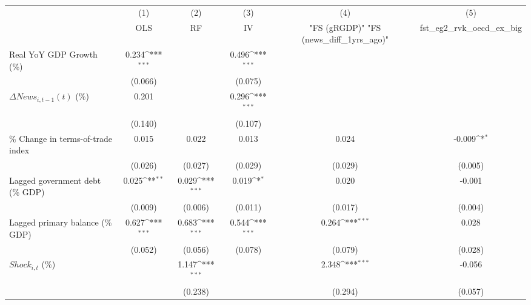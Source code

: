 {
\def\sym#1{\ifmmode^{#1}\else\(^{#1}\)\fi}
\begin{tabular}{l*{5}{c}}
\toprule
                    &\multicolumn{1}{c}{(1)}&\multicolumn{1}{c}{(2)}&\multicolumn{1}{c}{(3)}&\multicolumn{1}{c}{(4)}&\multicolumn{1}{c}{(5)}\\
                    &\multicolumn{1}{c}{OLS}&\multicolumn{1}{c}{RF}&\multicolumn{1}{c}{IV}&\multicolumn{1}{c}{ "FS (gRGDP)"  "FS (news_diff_1yrs_ago)" }&\multicolumn{1}{c}{fst_eg2_rvk_oecd_ex_big}\\
\midrule
Real YoY GDP Growth (\%)&       0.234\sym{***}&                     &       0.496\sym{***}&                     &                     \\
                    &     (0.066)         &                     &     (0.075)         &                     &                     \\
\addlinespace
$ \Delta News_{i,t-1}(t)$ (\%)&       0.201         &                     &       0.296\sym{***}&                     &                     \\
                    &     (0.140)         &                     &     (0.107)         &                     &                     \\
\addlinespace
\% Change in terms-of-trade index&       0.015         &       0.022         &       0.013         &       0.024         &      -0.009\sym{*}  \\
                    &     (0.026)         &     (0.027)         &     (0.029)         &     (0.029)         &     (0.005)         \\
\addlinespace
Lagged government debt (\% GDP)&       0.025\sym{**} &       0.029\sym{***}&       0.019\sym{*}  &       0.020         &      -0.001         \\
                    &     (0.009)         &     (0.006)         &     (0.011)         &     (0.017)         &     (0.004)         \\
\addlinespace
Lagged primary balance (\% GDP)&       0.627\sym{***}&       0.683\sym{***}&       0.544\sym{***}&       0.264\sym{***}&       0.028         \\
                    &     (0.052)         &     (0.056)         &     (0.078)         &     (0.079)         &     (0.028)         \\
\addlinespace
$ Shock_{i,t}$ (\%) &                     &       1.147\sym{***}&                     &       2.348\sym{***}&      -0.056         \\
                    &                     &     (0.238)         &                     &     (0.294)         &     (0.057)         \\

\end{tabular}}
